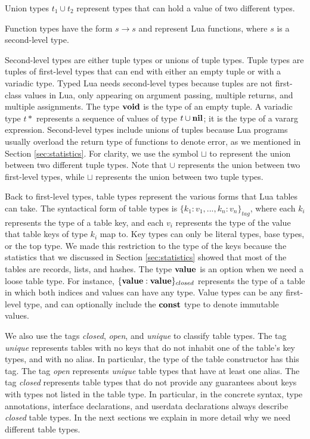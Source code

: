 Union types $t_{1} \cup t_{2}$ represent types that can hold a value
of two different types.

Function types have the form $s \rightarrow s$ and represent Lua functions,
where $s$ is a second-level type.

Second-level types are either tuple types or unions of tuple types.
Tuple types are tuples of first-level types that can end with
either an empty tuple or with a variadic type.
Typed Lua needs second-level types because tuples are not first-class
values in Lua, only appearing on argument passing, multiple returns,
and multiple assignments.
The type $\mathbf{void}$ is the type of an empty tuple.
A variadic type $t*$ represents a sequence of values of type $t \cup \mathbf{nil}$;
it is the type of a vararg expression.
Second-level types include unions of tuples because Lua programs
usually overload the return type of functions to denote error,
as we mentioned in Section \ref{sec:statistics}.
For clarity, we use the symbol $\sqcup$ to represent the union between
two different tuple types.
Note that $\cup$ represents the union between two first-level types,
while $\sqcup$ represents the union between two tuple types.

Back to first-level types, table types represent the various forms
that Lua tables can take.
The syntactical form of table types is $\{ k_{1}{:}v_{1}, ..., k_{n}{:}v_{n} \}_{tag}$,
where each $k_{i}$ represents the type of a table key,
and each $v_{i}$ represents the type of the value that table keys of type $k_{i}$ map to.
Key types can only be literal types, base types, or the top type.
We made this restriction to the type of the keys because the statistics
that we discussed in Section \ref{sec:statistics} showed that most
of the tables are records, lists, and hashes.
The type $\mathbf{value}$ is an option when we need a loose table type.
For instance, $\{\mathbf{value}:\mathbf{value}\}_{closed}$ represents the type of a
table in which both indices and values can have any type.
Value types can be any first-level type, and can optionally include
the $\mathbf{const}$ type to denote immutable values.

We also use the tags \emph{closed}, \emph{open}, and \emph{unique}
to classify table types.
The tag \emph{unique} represents tables with no keys that do not
inhabit one of the table's key types, and with no alias.
In particular, the type of the table constructor has this tag.
The tag \emph{open} represents \emph{unique} table types that
have at least one alias.
The tag \emph{closed} represents table types that do not provide
any guarantees about keys with types not listed in the table type.
In particular, in the concrete syntax, type annotations, interface
declarations, and userdata declarations always describe \emph{closed} table types.
In the next sections we explain in more detail why we need
different table types.

